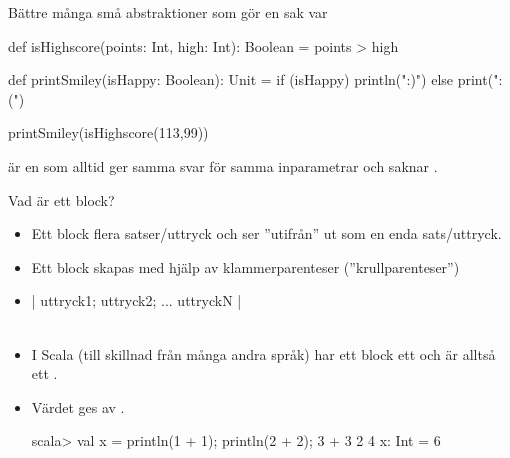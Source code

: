 \begin{Slide}{Bättre många små abstraktioner som gör en sak var}

\begin{Code}[basicstyle=\ttfamily\fontsize{8}{11}\selectfont]
def isHighscore(points: Int, high: Int): Boolean = points > high

def printSmiley(isHappy: Boolean): Unit =
  if (isHappy) println(":)") else print(":(")
\end{Code}

\pause\vspace{2em}
\begin{REPLnonum}
  printSmiley(isHighscore(113,99))
\end{REPLnonum}

\pause\vspace{2em}  är en  som alltid ger samma svar för samma inparametrar och saknar .

\end{Slide}



\begin{Slide}{Vad är ett block?}

\begin{itemize}
\item Ett block  flera satser/uttryck och ser ''utifrån'' ut som en enda sats/uttryck.

\item Ett block skapas med hjälp av klammerparenteser (''krullparenteser'')

\item [] {\fontsize{14}{18}\selectfont \code|{ uttryck1; uttryck2; ... uttryckN }|}\\~

\pause

\item I Scala (till skillnad från många andra språk) har ett block ett  och är alltså ett .

\item Värdet ges av .

\begin{REPLnonum}
scala> val x = { println(1 + 1); println(2 + 2); 3 + 3 }
2
4
x: Int = 6
\end{REPLnonum}


\end{itemize}

\end{Slide}

